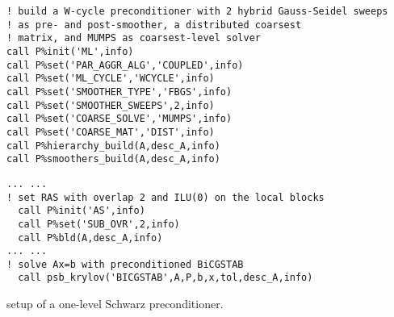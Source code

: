 \begin{listing}[h!]
\ifpdf
\begin{verbatim}
! build a W-cycle preconditioner with 2 hybrid Gauss-Seidel sweeps
! as pre- and post-smoother, a distributed coarsest
! matrix, and MUMPS as coarsest-level solver
call P%init('ML',info)
call P%set('PAR_AGGR_ALG','COUPLED',info)
call P%set('ML_CYCLE','WCYCLE',info)
call P%set('SMOOTHER_TYPE','FBGS',info)
call P%set('SMOOTHER_SWEEPS',2,info)
call P%set('COARSE_SOLVE','MUMPS',info)
call P%set('COARSE_MAT','DIST',info)
call P%hierarchy_build(A,desc_A,info)
call P%smoothers_build(A,desc_A,info)
\end{verbatim}
\else
\begin{center}
\begin{minipage}{.90\textwidth}
{\small
\begin{verbatim}
... ...
! set RAS with overlap 2 and ILU(0) on the local blocks
  call P%init('AS',info)
  call P%set('SUB_OVR',2,info)
  call P%bld(A,desc_A,info)
... ...
! solve Ax=b with preconditioned BiCGSTAB
  call psb_krylov('BICGSTAB',A,P,b,x,tol,desc_A,info)
\end{verbatim}
}
\end{minipage}
\end{center}
\fi\vspace{-2em}%
\caption{setup of a one-level Schwarz preconditioner.\label{fig:ex4}}
\end{listing}


